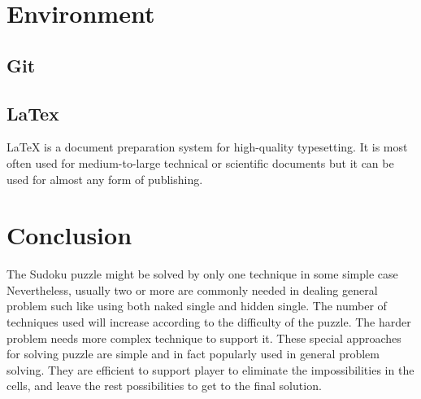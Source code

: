 \documentclass[11pt]{report}
\begin{document}
\chapter{Environment}
\label{cha:Environment}

\section{Git}
\label{sec:git}


\section{LaTex}
\label{sec:latex}
LaTeX is a document preparation system for high-quality typesetting. It is most often used for medium-to-large technical or scientific documents but it can be used for almost any form of publishing.

\chapter{Conclusion}
\label{cha:Conclusion}
The Sudoku puzzle might be solved by only one technique in some simple case Nevertheless, usually two or more are commonly needed in dealing general problem such like using both naked single and hidden single. The number of techniques used will increase according to the difficulty of the puzzle. The harder problem needs more complex technique to support it.
These special approaches for solving puzzle are simple and in fact popularly used in general problem solving. They are efficient to support player to eliminate the impossibilities in the cells, and leave the rest possibilities to get to the final solution.





\end{document}
